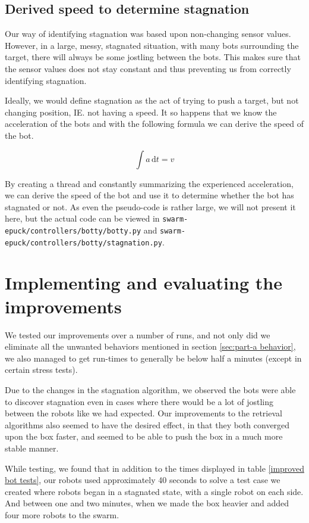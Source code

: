 \documentclass[a4paper,10pt]{article}
\begin{document}
\subsection{Derived speed to determine stagnation}

Our way of identifying stagnation was based upon non-changing sensor values.  
However, in a large, messy, stagnated situation, with many bots surrounding 
the target, there will always be some jostling between the bots. This makes 
sure that the sensor values does not stay constant and thus preventing us from 
correctly identifying stagnation.

Ideally, we would define stagnation as the act of trying to push a target, but 
not changing position, IE. not having a speed. It so happens that we know the 
acceleration of the bots and with the following formula we can derive the 
speed of the bot.

$$\int a \,\mathrm{d}t = v$$

By creating a thread and constantly summarizing the experienced acceleration, 
we can derive the speed of the bot and use it to determine whether the bot has 
stagnated or not. As even the pseudo-code is rather large, we will not present 
it here, but the actual code can be viewed in
\texttt{swarm-epuck/controllers/botty/botty.py} and 
\texttt{swarm-epuck/controllers/botty/stagnation.py}.

\section{Implementing and evaluating the improvements}

We tested our improvements over a number of runs, and not only did we eliminate
all the unwanted behaviors  mentioned in section \ref{sec:part-a behavior}, we also managed 
to get run-times to generally be below half a minutes (except in certain stress tests).

Due to the changes in the stagnation algorithm, we observed the bots were able 
to discover stagnation even in cases where there would be a lot of jostling
between the robots like we had expected. Our improvements to the retrieval
algorithms also seemed to have the desired effect, in that they both
converged upon the box faster, and seemed to be able to push the box
in a much more stable manner.

While testing, we found that in addition to the times displayed in table
\ref{improved bot tests}, our robots used approximately 40 seconds to
solve a test case we created where robots began in a stagnated state,
with a single robot on each side. And between one and two minutes, when
we made the box heavier and added four more robots to the swarm.
\end{document}
